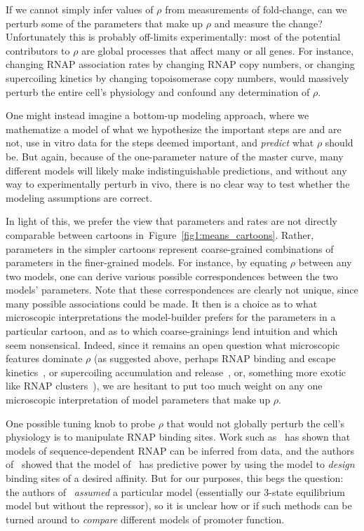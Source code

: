 \documentclass[12pt]{article}%
\newcommand{\fig}[1]{Figure~\ref{#1}}
\begin{document}
If we cannot simply infer values of $\rho$ from measurements of
fold-change, can we perturb some of the parameters that make up
$\rho$ and measure the change? Unfortunately this is probably
off-limits experimentally: most of the potential contributors to
$\rho$ are global processes that affect many or all genes. For
instance, changing RNAP association rates by changing RNAP copy
numbers, or changing supercoiling kinetics by changing
topoisomerase copy numbers, would massively perturb the entire
cell's physiology and confound any determination of $\rho$.

One might instead imagine a bottom-up modeling approach, where we
mathematize a model of what we hypothesize the important steps
are and are not, use in vitro data for the steps deemed
important, and \textit{predict} what $\rho$ should be.
But again, because of the one-parameter nature of the master
curve, many different models will likely make indistinguishable
predictions, and without any way to experimentally perturb in
vivo, there is no clear way to test whether the modeling
assumptions are correct.

In light of this, we prefer the view that parameters and rates
are not directly comparable between cartoons
in~\fig{fig1:means_cartoons}. Rather, parameters in the
simpler cartoons represent coarse-grained combinations of
parameters in the finer-grained models. For instance, by equating
$\rho$ between any two models, one can derive various possible
correspondences between the two models' parameters. Note that
these correspondences are clearly not unique, since many possible
associations could be made. It then is a choice as to what microscopic
interpretations the model-builder prefers for the parameters in a
particular cartoon, and as to which coarse-grainings lend
intuition and which seem nonsensical. Indeed, since it remains an open question what microscopic features dominate $\rho$ (as suggested above, perhaps RNAP binding and escape
kinetics~\cite{DeHaseth1998, Mitarai2015}, or supercoiling
accumulation and release~\cite{Chong2014, Sevier2016}, or,
something more exotic like RNAP clusters~\cite{Cisse2013}), we are hesitant to put too much weight on any one microscopic interpretation of model parameters that make up $\rho$.

One possible tuning knob to probe $\rho$ that would not globally
perturb the cell's physiology is to manipulate RNAP binding sites.
Work such as~\cite{Kinney2010} has shown that models of
sequence-dependent RNAP can be inferred from data, and the
authors of~\cite{Brewster2012} showed that the model
of~\cite{Kinney2010} has predictive power by using the model to
\textit{design} binding sites of a desired affinity.
But for our purposes, this begs the question: the authors
of~\cite{Kinney2010} \textit{assumed} a particular model
(essentially our 3-state equilibrium model but without the
repressor), so it is unclear how or if such methods can be turned
around to \textit{compare} different models of promoter function.
\end{document}
